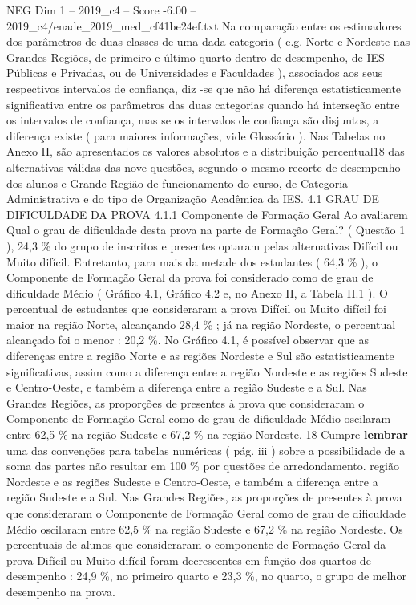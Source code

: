 \begin{textsample}{NEG Dim 1 – 2019\_c4 – Score -6.00 – 2019\_c4/enade\_2019\_med\_cf41be24ef.txt}
Na comparação entre os estimadores dos parâmetros de duas classes de uma dada categoria ( e.g.
Norte e Nordeste nas Grandes Regiões, de primeiro e último quarto dentro de desempenho, de IES Públicas e Privadas, ou de Universidades e Faculdades ), associados aos seus respectivos intervalos de confiança, diz -se que não há diferença estatisticamente significativa entre os parâmetros das duas categorias quando há interseção entre os intervalos de confiança, mas se os intervalos de confiança são disjuntos, a diferença existe ( para maiores informações, vide Glossário ).
Nas Tabelas no Anexo II, são apresentados os valores absolutos e a distribuição percentual18 das alternativas válidas das nove questões, segundo o mesmo recorte de desempenho dos alunos e Grande Região de funcionamento do curso, de Categoria Administrativa e do tipo de Organização Acadêmica da IES. 4.1 GRAU DE DIFICULDADE DA PROVA 4.1.1 Componente de Formação Geral Ao avaliarem Qual o grau de dificuldade desta prova na parte de Formação Geral? ( Questão 1 ), 24,3 \% do grupo de inscritos e presentes optaram pelas alternativas Difícil ou Muito difícil.
Entretanto, para mais da metade dos estudantes ( 64,3 \% ), o Componente de Formação Geral da prova foi considerado como de grau de dificuldade Médio ( Gráfico 4.1, Gráfico 4.2 e, no Anexo II, a Tabela II.1 ).
O percentual de estudantes que consideraram a prova Difícil ou Muito difícil foi maior na região Norte, alcançando 28,4 \% ; já na região Nordeste, o percentual alcançado foi o menor : 20,2 \%.
No Gráfico 4.1, é possível observar que as diferenças entre a região Norte e as regiões Nordeste e Sul são estatisticamente significativas, assim como a diferença entre a região Nordeste e as regiões Sudeste e Centro-Oeste, e também a diferença entre a região Sudeste e a Sul.
Nas Grandes Regiões, as proporções de presentes à prova que consideraram o Componente de Formação Geral como de grau de dificuldade Médio oscilaram entre 62,5 \% na região Sudeste e 67,2 \% na região Nordeste. 18 Cumpre \textbf{lembrar} uma das convenções para tabelas numéricas ( pág. iii ) sobre a possibilidade de a soma das partes não resultar em 100 \% por questões de arredondamento. região Nordeste e as regiões Sudeste e Centro-Oeste, e também a diferença entre a região Sudeste e a Sul.
Nas Grandes Regiões, as proporções de presentes à prova que consideraram o Componente de Formação Geral como de grau de dificuldade Médio oscilaram entre 62,5 \% na região Sudeste e 67,2 \% na região Nordeste.
Os percentuais de alunos que consideraram o componente de Formação Geral da prova Difícil ou Muito difícil foram decrescentes em função dos quartos de desempenho : 24,9 \%, no primeiro quarto e 23,3 \%, no quarto, o grupo de melhor desempenho na prova.

\end{textsample}
